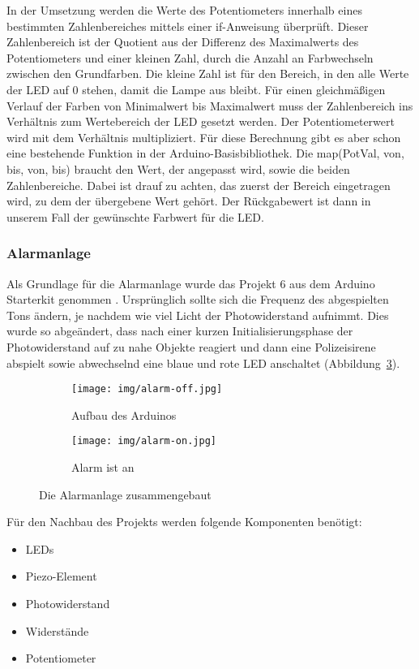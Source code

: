In der Umsetzung werden die Werte des Potentiometers innerhalb eines bestimmten Zahlenbereiches mittels einer if-Anweisung überprüft. Dieser Zahlenbereich ist der Quotient aus der Differenz des Maximalwerts des Potentiometers und einer kleinen Zahl, durch die Anzahl an Farbwechseln zwischen den Grundfarben. Die kleine Zahl ist für den Bereich, in den alle Werte der LED auf 0 stehen, damit die Lampe aus bleibt. Für einen gleichmäßigen Verlauf der Farben von Minimalwert bis Maximalwert muss der Zahlenbereich ins Verhältnis zum Wertebereich der LED gesetzt werden. Der Potentiometerwert wird mit dem Verhältnis multipliziert. Für diese Berechnung gibt es aber schon eine bestehende Funktion in der Arduino-Basisbibliothek. Die map(PotVal, von, bis, von, bis) braucht den Wert, der angepasst wird, sowie die beiden Zahlenbereiche. Dabei ist drauf zu achten, das zuerst der Bereich eingetragen wird, zu dem der übergebene Wert gehört. Der Rückgabewert ist dann in unserem Fall der gewünschte Farbwert für die LED.


\subsubsection{Alarmanlage}
Als Grundlage für die Alarmanlage wurde das Projekt 6 aus dem Arduino Starterkit genommen \parencite{arduino}. Ursprünglich sollte sich die Frequenz des abgespielten Tons ändern, je nachdem wie viel Licht der Photowiderstand aufnimmt. Dies wurde so abgeändert, dass nach einer kurzen Initialisierungsphase der Photowiderstand auf zu nahe Objekte reagiert und dann eine Polizeisirene abspielt sowie abwechselnd eine blaue und rote LED anschaltet (Abbildung~\ref{fig:alarman}).

\begin{figure}[h]
	\centering
	\begin{subfigure}[b]{0.48\linewidth}
		\centering
		\texttt{[image: img/alarm-off.jpg]}
		\caption{Aufbau des Arduinos}
			\label{fig:alarmaufbau}
	\end{subfigure}\enspace%
	\begin{subfigure}[b]{0.48\linewidth}
		\centering
		\texttt{[image: img/alarm-on.jpg]}
		\caption{Alarm ist an}
		\label{fig:alarman}
	\end{subfigure}
	\caption{Die Alarmanlage zusammengebaut}
\end{figure}

Für den Nachbau des Projekts werden folgende Komponenten benötigt:
\begin{itemize}
\item{LEDs}
\item{Piezo-Element}
\item{Photowiderstand}
\item{Widerstände}
\item{Potentiometer}
\end{itemize}

